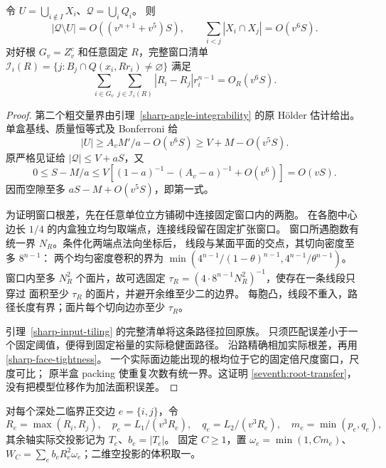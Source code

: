 \begin{lemma}[实际空隙及窗口根差]\label{seventh:window}
令 \(U=\bigcup_{i\notin I}X_i\)、\(\mathcal Q=\bigcup_iQ_i\)。
则
\begin{equation}\label{seventh:void}
 |\mathcal Q\setminus U|=O((v^{n+1}+v^5)S),\qquad
 \sum_{i<j}|X_i\cap X_j|=O(v^6S).
\end{equation}
对好根 \(G_v=Z_v^c\) 和任意固定 \(R\)，完整窗口清单
\(\mathcal I_i(R)=\{j:B_j\cap Q(x_i,Rr_i)\ne\varnothing\}\) 满足
\begin{equation}\label{seventh:root-transfer}
 \sum_{i\in G_v}\sum_{j\in\mathcal I_i(R)}
       |R_i-R_j|r_i^{n-1}=O_R(v^6S).
\end{equation}
\end{lemma}
\begin{proof}
第二个粗交量界由引理~\ref{sharp-angle-integrability} 的原 Hölder 估计给出。
单盒基线、质量恒等式及 Bonferroni 给
\[
 |U|\ge A_vM'/a-O(v^6S)\ge V+M-O(v^5S).
\]
原严格见证给 \(|\mathcal Q|\le V+aS\)，又
\[
 0\le S-M/a\le
 V\left[(1-a)^{-1}-(A_v-a)^{-1}+O(v^6)\right]=O(vS).
\]
因而空隙至多 \(aS-M+O(v^5S)\)，即第一式。

为证明窗口根差，先在任意单位立方铺砌中连接固定窗口内的两胞。
在各胞中心边长 \(1/4\) 的内盒独立均匀取端点，连接线段留在固定扩张窗口。
窗口所遇胞数有统一界 \(N_R\)。条件化两端点法向坐标后，
线段与某面平面的交点，其切向密度至多 \(8^{n-1}\)：
两个均匀密度卷积的界为
\(\min(4^{n-1}/(1-\theta)^{n-1},4^{n-1}/\theta^{n-1})\)。
窗口内至多 \(N_R^2\) 个面片，故可选固定
\(\tau_R=(4\cdot8^{n-1}N_R^2)^{-1}\)，使存在一条线段只穿过
面积至少 \(\tau_R\) 的面片，并避开余维至少二的边界。
每胞凸，线段不重入，路径长度有界；面片每个切向边亦至少 \(\tau_R\)。

引理~\ref{sharp-input-tiling} 的完整清单将这条路径拉回原族。
只须匹配误差小于一个固定阈值，便得到固定裕量的实际稳健面路径。
沿路精确相加实际根差，再用 \eqref{sharp-face-tightness}。
一个实际面边能出现的根均位于它的固定倍尺度窗口，尺度可比；
原半盒 packing 使重复次数有统一界。这证明 \eqref{seventh:root-transfer}，
没有把模型位移作为加法面积误差。
\end{proof}

对每个深处二临界正交边 \(e=\{i,j\}\)，令
\[
 R_e=\max(R_i,R_j),\quad
 p_e=L_1/(v^3R_e),\quad q_e=L_2/(v^3R_e),\quad m_e=\min(p_e,q_e),
\]
其余轴实际交投影记为 \(T_e\)、\(b_e=|T_e|\)。
固定 \(C\ge1\)，置 \(\omega_e=\min(1,Cm_e)\)、
\(W_C=\sum_e b_eR_e^2\omega_e\)；二维空投影的体积取一。

